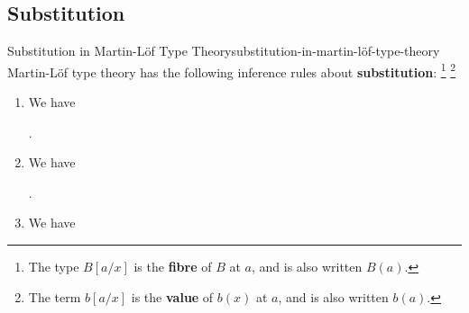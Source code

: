 \subsection{Substitution}\label{subsection-substitution-in-martin-löf-type-theory}
\begin{definition}{Substitution in Martin-Löf Type Theory}{substitution-in-martin-löf-type-theory}%
    Martin-Löf type theory has the following inference rules about \textbf{substitution}:%
    \footnote{%
        The type $B[a/x]$ is the \textbf{fibre} of $B$ at $a$, and is also written $B(a)$.
    }%
    \footnote{%
        The term $b[a/x]$ is the \textbf{value} of $b(x)$ at $a$, and is also written $b(a)$.
        \par\vspace*{\TCBBoxCorrection}
    }%
    \begin{enumerate}
        \item\label{substitution-in-martin-löf-type-theory-substitution-in-types}We have
            \begin{webprooftree}%
                \begin{prooftree}%
                \end{prooftree}%
                .%
            \end{webprooftree}%
        \item\label{substitution-in-martin-löf-type-theory-substitution-in-terms}We have
            \begin{webprooftree}%
                \begin{prooftree}%
                \end{prooftree}%
                .%
            \end{webprooftree}%
        \item\label{substitution-in-martin-löf-type-theory-substitution-in-judgemental-equality-of-types}We have

\end{enumerate}
\end{definition}
